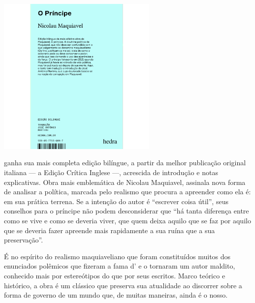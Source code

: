 \pagebreak

\begin{center}
\hspace*{-3.5cm}
\hspace*{3cm}\includegraphics[width=78mm]{./grid/maquiavel.jpg}
\end{center}

\hspace*{-7cm}\hrulefill\hspace*{-7cm}

\medskip

 ganha sua mais completa edição bilíngue, a partir da melhor publicação original italiana --- a Edição Crítica Inglese ---, acrescida de introdução e notas explicativas. Obra mais emblemática de Nicolau Maquiavel, {} assinala nova forma de analisar a política, marcada pelo realismo que procura a apreender como ela é: em sua prática terrena. Se a intenção do autor é “escrever coisa útil”, seus conselhos para o príncipe não podem desconsiderar que “há tanta diferença entre como se vive e como se deveria viver, que quem deixa aquilo que se faz por aquilo que se deveria fazer apreende mais rapidamente a sua ruína que a sua preservação”.

É no espírito do realismo maquiaveliano que foram constituídos muitos dos enunciados polêmicos que fizeram a fama d'{} e o tornaram um autor maldito, conhecido mais por estereótipos do que por seus escritos. Marco teórico e histórico, a obra é um clássico que preserva sua atualidade ao discorrer sobre a forma de governo de um mundo que, de muitas maneiras, ainda é o nosso.


\vfill

